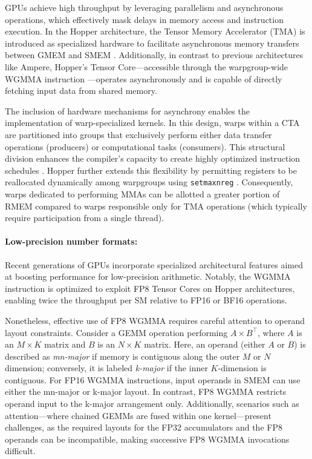 GPUs achieve high throughput by leveraging parallelism and asynchronous operations, which effectively mask delays in memory access and instruction execution. In the Hopper architecture, the Tensor Memory Accelerator (TMA) is introduced as specialized hardware to facilitate asynchronous memory transfers between GMEM and SMEM \cite[\S7.29]{cuda}. Additionally, in contrast to previous architectures like Ampere, Hopper’s Tensor Core—accessible through the warpgroup-wide WGMMA instruction \cite[\S9.7.14]{ptx}—operates asynchronously and is capable of directly fetching input data from shared memory.

The inclusion of hardware mechanisms for asynchrony enables the implementation of warp-specialized kernels. In this design, warps within a CTA are partitioned into groups that exclusively perform either data transfer operations (producers) or computational tasks (consumers). This structural division enhances the compiler’s capacity to create highly optimized instruction schedules \citep{warp-specialization-2011}. Hopper further extends this flexibility by permitting registers to be reallocated dynamically among warpgroups using \verb|setmaxnreg| \cite[\S9.7.17.1]{ptx}. Consequently, warps dedicated to performing MMAs can be allotted a greater portion of RMEM compared to warps responsible only for TMA operations (which typically require participation from a single thread).

\paragraph{Low-precision number formats:}
\label{sec:low-precision-gpu}
Recent generations of GPUs incorporate specialized architectural features aimed at boosting performance for low-precision arithmetic. Notably, the WGMMA instruction is optimized to exploit FP8 Tensor Cores on Hopper architectures, enabling twice the throughput per SM relative to FP16 or BF16 operations.

Nonetheless, effective use of FP8 WGMMA requires careful attention to operand layout constraints. Consider a GEMM operation performing $A \times B^{\top}$, where $A$ is an $M\times K$ matrix and $B$ is an $N\times K$ matrix. Here, an operand (either $A$ or $B$) is described as \emph{mn-major} if memory is contiguous along the outer $M$ or $N$ dimension; conversely, it is labeled \emph{k-major} if the inner $K$-dimension is contiguous. For FP16 WGMMA instructions, input operands in SMEM can use either the mn-major or k-major layout. In contrast, FP8 WGMMA restricts operand input to the k-major arrangement only. Additionally, scenarios such as attention—where chained GEMMs are fused within one kernel—present challenges, as the required layouts for the FP32 accumulators and the FP8 operands can be incompatible, making successive FP8 WGMMA invocations difficult.

